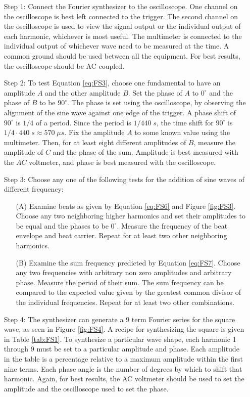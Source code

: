 \documentclass[12pt, a4paper, oneside, openright, titlepage]{book}
\begin{document}
\begin{itemize}[leftmargin = 50pt]
    \item[Step 1:] Connect the Fourier synthesizer to the oscilloscope. One channel on the oscilloscope is best left connected to the trigger. The second channel on the oscilloscope is used to view the signal output or the individual output of each harmonic, whichever is most useful. The multimeter is connected to the individual output of whichever wave need to be measured at the time. A common ground should be used between all the equipment. For best results, the oscilloscope should be AC coupled.
    \item[Step 2:] To test Equation \ref{eq:FS3}, choose one fundamental to have an amplitude $A$ and the other amplitude $B$. Set the phase of $A$ to $0^{\circ}$ and the phase of $B$ to be $90^{\circ}$. The phase is set using the oscilloscope, by observing the alignment of the sine wave against one edge of the trigger. A phase shift of $90^{\circ}$ is $1/4$ of a period. Since the period is $1/440\;s$, the time shift for $90^{\circ}$ is $1/4\cdot440\;s \approx 570\;\mu s$. Fix the amplitude $A$ to some known value using the multimeter. Then, for at least eight different amplitudes of $B$, measure the amplitude of $C$ and the phase of the sum. Amplitude is best measured with the $AC$ voltmeter, and phase is best measured with the oscilloscope.
    \item[Step 3:] Choose any one of the following tests for the addition of sine waves of different frequency:
        \begin{enumerate}
            \item[(A)] Examine beats as given by Equation \ref{eq:FS6} and Figure \ref{fig:FS3}. Choose any two neighboring higher harmonics and set their amplitudes to be equal and the phases to be $0^{\circ}$. Measure the frequency of the beat envelope and beat carrier. Repeat for at least two other neighboring harmonics.
            \item[(B)] Examine the sum frequency predicted by Equation \ref{eq:FS7}. Choose any two frequencies with arbitrary non zero amplitudes and arbitrary phase. Measure the period of their sum. The sum frequency can be compared to the expected value given by the greatest common divisor of the individual frequencies. Repeat for at least two other combinations.
        \end{enumerate}
    \item[Step 4:] The synthesizer can generate a $9$ term Fourier series for the square wave, as seen in Figure \ref{fig:FS4}. A recipe for synthesizing the square is given in Table \ref{tab:FS1}. To synthesize a particular wave shape, each harmonic 1 through 9 must be set to a particular amplitude and phase. Each amplitude in the table is a percentage relative to a maximum amplitude within the first nine terms. Each phase angle is the number of degrees by which to shift that harmonic. Again, for best results, the AC voltmeter should be used to set the amplitude and the oscilloscope used to set the phase. 
        

\end{itemize}
\end{document}

